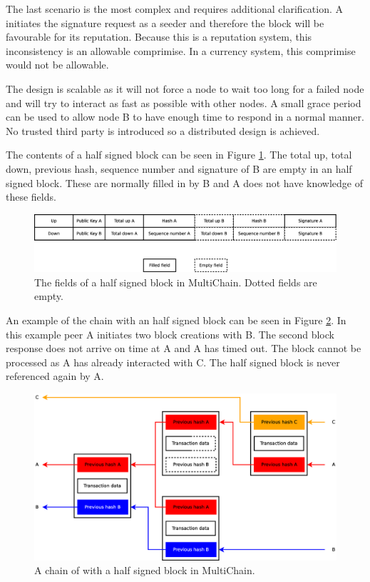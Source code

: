 The last scenario is the most complex and requires additional clarification.
A initiates the signature request as a seeder and therefore the block will be favourable for its reputation.
Because this is a reputation system, this inconsistency is an allowable comprimise.
In a currency system, this comprimise would not be allowable.

The design is scalable as it will not force a node to wait too long for a failed node
and will try to interact as fast as possible with other nodes.
A small grace period can be used to allow node B to have enough time to respond in a normal manner.
No trusted third party is introduced so a distributed design is achieved.

The contents of a half signed block can be seen in Figure \ref{fig:halfsigned-block}.
The total up, total down, previous hash, sequence number and signature of B are empty in an half signed block.
These are normally filled in by B and A does not have knowledge of these fields.

\begin{figure}
	\centerline{\includegraphics[scale=0.3]{design/figs/halfsigned-block.eps}}
	\caption{The fields of a half signed block in MultiChain. Dotted fields are empty.}
	\label{fig:halfsigned-block}
\end{figure}

An example of the chain with an half signed block can be seen in Figure \ref{fig:halfsigned-chain}.
In this example peer A initiates two block creations with B.
The second block response does not arrive on time at A and A has timed out.
The block cannot be processed as A has already interacted with C.
The half signed block is never referenced again by A.

\begin{figure}
	\centerline{\includegraphics[scale=0.3]{design/figs/halfsigned-chain.eps}}
	\caption{A chain of with a half signed block in MultiChain.}
	\label{fig:halfsigned-chain}
\end{figure}